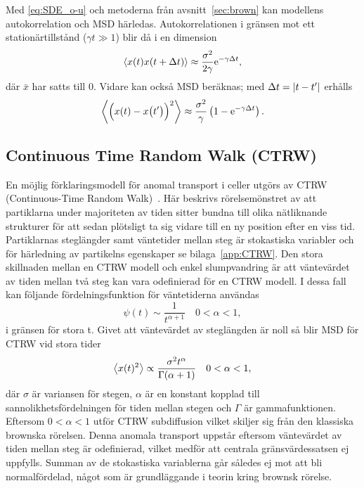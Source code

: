 Med \eqref{eq:SDE_o-u} och metoderna från avsnitt~\ref{sec:brown} kan modellens autokorrelation och MSD härledas. Autokorrelationen i gränsen mot ett stationärtillstånd ($\gamma t\gg 1$) blir då i en dimension
\begin{equation}\label{eq:COV_o-u}
\ev{x(t)x(t+\Delta{t})} \approx \frac{\sigma^2}{2\gamma} \ee^{-\gamma\Delta{t}},
\end{equation}
där $\bar{x}$ har satts till 0. Vidare kan också MSD beräknas; med $\Delta{t}=\abs{t-t'}$ erhålls
\begin{equation}\label{eq:MSD_o-u}
\ev{\Big(x(t)-x\big(t'\big) \Big)^2} 
\approx \frac{\sigma^2}{\gamma} \left( 1-\ee^{-\gamma \Delta{t}} \right).
\end{equation}




\subsection{Continuous Time Random Walk (CTRW)}
En möjlig förklaringsmodell för anomal transport i celler utgörs av CTRW (Continuous-Time Random Walk)~\cite{Hofling&Franosch2013}. Här beskrivs rörelsemönstret av att partiklarna under majoriteten av tiden sitter bundna till olika nätliknande strukturer för att sedan plötsligt ta sig vidare till en ny position efter en viss tid. Partiklarnas steglängder samt väntetider mellan steg är stokastiska variabler och för härledning av partikelns egenskaper se bilaga~\ref{app:CTRW}. Den stora skillnaden mellan en CTRW modell och enkel slumpvandring är att väntevärdet av tiden mellan två steg kan vara odefinierad för en CTRW modell. I dessa fall kan följande fördelningsfunktion för väntetiderna användas
\begin{equation}
\psi(t) \sim \frac{1}{t^{\alpha+1}}\quad 0<\alpha<1,
\end{equation}
i gränsen för stora t.
Givet att väntevärdet av steglängden är noll så blir MSD för CTRW vid stora tider
\begin{equation}\label{eq:CTRW_MSD}
    \ev{x(t)^2} \propto \frac{\sigma^2t^{\alpha}}{\Gamma (\alpha+1)}\quad 0<\alpha<1,
\end{equation}
där $\sigma$ är variansen för stegen, $\alpha$ är en konstant kopplad till sannolikhetsfördelningen för tiden mellan stegen och $\Gamma$ är gammafunktionen. Eftersom $0<\alpha<1$ utför CTRW subdiffusion vilket skiljer sig från den klassiska brownska rörelsen. Denna anomala transport uppstår eftersom väntevärdet av tiden mellan steg är odefinierad, vilket medför att centrala gränsvärdessatsen ej uppfylls. Summan av de stokastiska variablerna går således ej mot att bli normalfördelad, något som är grundläggande i teorin kring brownsk rörelse.


